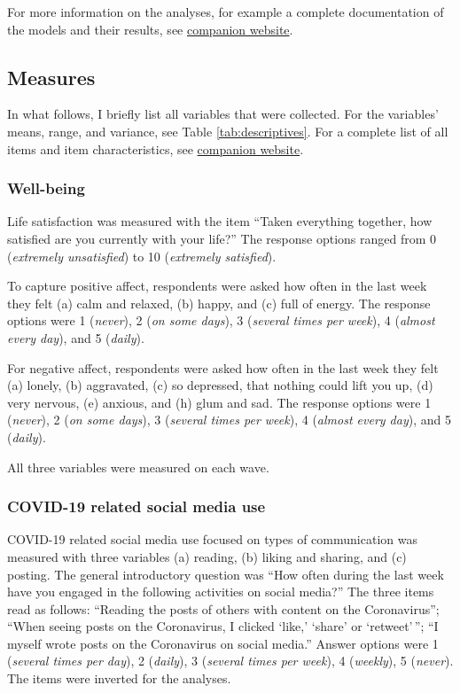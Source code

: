 \documentclass[
  english,
  man,mask,floatsintext]{apa6}
\begin{document}
For more information on the analyses, for example a complete documentation of the models and their results, see \href{https://xmtra.github.io/Austrian_Corona_Panel_Project/index.html}{companion website}.

\hypertarget{measures}{%
\subsection{Measures}\label{measures}}

In what follows, I briefly list all variables that were collected.
For the variables' means, range, and variance, see Table \ref{tab:descriptives}.
For a complete list of all items and item characteristics, see \href{https://xmtra.github.io/Austrian_Corona_Panel_Project/index.html}{companion website}.

\hypertarget{well-being}{%
\subsubsection{Well-being}\label{well-being}}

Life satisfaction was measured with the item ``Taken everything together, how satisfied are you currently with your life?''
The response options ranged from 0 (\emph{extremely unsatisfied}) to 10 (\emph{extremely satisfied}).

To capture positive affect, respondents were asked how often in the last week they felt (a) calm and relaxed, (b) happy, and (c) full of energy.
The response options were 1 (\emph{never}), 2 (\emph{on some days}), 3 (\emph{several times per week}), 4 (\emph{almost every day}), and 5 (\emph{daily}).

For negative affect, respondents were asked how often in the last week they felt (a) lonely, (b) aggravated, (c) so depressed, that nothing could lift you up, (d) very nervous, (e) anxious, and (h) glum and sad.
The response options were 1 (\emph{never}), 2 (\emph{on some days}), 3 (\emph{several times per week}), 4 (\emph{almost every day}), and 5 (\emph{daily}).

All three variables were measured on each wave.

\hypertarget{covid-19-related-social-media-use}{%
\subsubsection{COVID-19 related social media use}\label{covid-19-related-social-media-use}}

COVID-19 related social media use focused on types of communication was measured with three variables (a) reading, (b) liking and sharing, and (c) posting.
The general introductory question was ``How often during the last week have you engaged in the following activities on social media?''
The three items read as follows:
``Reading the posts of others with content on the Coronavirus''; ``When seeing posts on the Coronavirus, I clicked `like,' `share' or `retweet'\,''; ``I myself wrote posts on the Coronavirus on social media.''
Answer options were 1 (\emph{several times per day}), 2 (\emph{daily}), 3 (\emph{several times per week}), 4 (\emph{weekly}), 5 (\emph{never}).
The items were inverted for the analyses.
\end{document}
